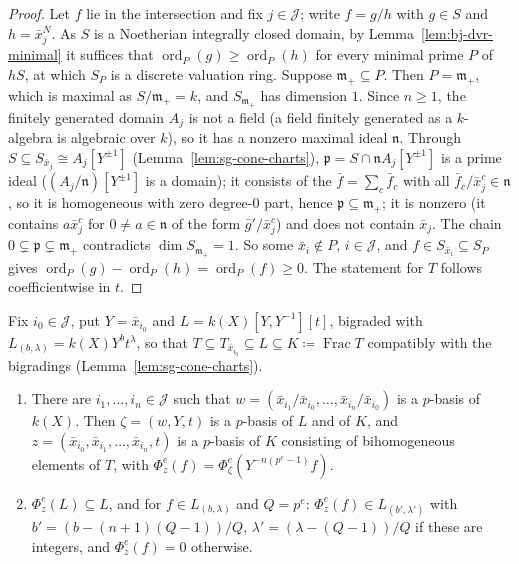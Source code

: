 \begin{proof}
Let $f$ lie in the intersection and fix $j\in\mathcal J$; write $f=g/h$ with $g\in S$ and $h=\bar x_j^N$. As $S$ is a Noetherian integrally closed
domain, by Lemma~\ref{lem:bj-dvr-minimal} it suffices that $\operatorname{ord}_P(g)\ge\operatorname{ord}_P(h)$ for every minimal prime $P$ of $hS$, at which $S_P$ is a discrete
valuation ring. Suppose $\mathfrak m_+\subseteq P$. Then $P=\mathfrak m_+$, which is maximal as $S/\mathfrak m_+=k$, and $S_{\mathfrak m_+}$ has dimension $1$. Since
$n\ge1$, the finitely generated domain $A_j$ is not a field (a field finitely generated as a $k$-algebra is algebraic over $k$), so it has
a nonzero maximal ideal $\mathfrak n$. Through $S\subseteq S_{\bar x_j}\cong A_j[Y^{\pm1}]$ (Lemma~\ref{lem:sg-cone-charts}), $\mathfrak p=S\cap\mathfrak nA_j[Y^{\pm1}]$ is a
prime ideal ($(A_j/\mathfrak n)[Y^{\pm1}]$ is a domain); it consists of the $\bar f=\sum_c\bar f_c$ with all $\bar f_c/\bar x_j^c\in\mathfrak n$, so it is homogeneous
with zero degree-$0$ part, hence $\mathfrak p\subseteq\mathfrak m_+$; it is nonzero (it contains $a\bar x_j^c$ for $0\ne a\in\mathfrak n$ of the form
$\bar g'/\bar x_j^c$) and does not contain $\bar x_j$. The chain $0\subsetneq\mathfrak p\subsetneq\mathfrak m_+$ contradicts $\dim S_{\mathfrak m_+}=1$. So some
$\bar x_i\notin P$, $i\in\mathcal J$, and $f\in S_{\bar x_i}\subseteq S_P$ gives $\operatorname{ord}_P(g)-\operatorname{ord}_P(h)=\operatorname{ord}_P(f)\ge0$. The statement for $T$ follows
coefficientwise in $t$.
\end{proof}

\begin{lemma}\label{lem:sg-homog-pbasis}
\leanok
{}
Fix $i_0\in\mathcal J$, put $Y=\bar x_{i_0}$ and $L=k(X)[Y,Y^{-1}][t]$, bigraded with $L_{(b,\lambda)}=k(X)Y^bt^\lambda$, so that
$T\subseteq T_{\bar x_{i_0}}\subseteq L\subseteq K\coloneqq\operatorname{Frac}T$ compatibly with the bigradings (Lemma~\ref{lem:sg-cone-charts}).
\begin{enumerate}
\item There are $i_1,\dots,i_n\in\mathcal J$ such that $w=(\bar x_{i_1}/\bar x_{i_0},\dots,\bar x_{i_n}/\bar x_{i_0})$ is a $p$-basis of $k(X)$. Then
$\zeta=(w,Y,t)$ is a $p$-basis of $L$ and of $K$, and $z=(\bar x_{i_0},\bar x_{i_1},\dots,\bar x_{i_n},t)$ is a $p$-basis of $K$ consisting of
bihomogeneous elements of $T$, with $\Phi^e_z(f)=\Phi^e_\zeta(Y^{-n(p^e-1)}f)$.
\item $\Phi^e_z(L)\subseteq L$, and for $f\in L_{(b,\lambda)}$ and $Q=p^e$: $\Phi^e_z(f)\in L_{(b',\lambda')}$ with
$b'=(b-(n+1)(Q-1))/Q$, $\lambda'=(\lambda-(Q-1))/Q$ if these are integers, and $\Phi^e_z(f)=0$ otherwise.
\end{enumerate}
\end{lemma}


